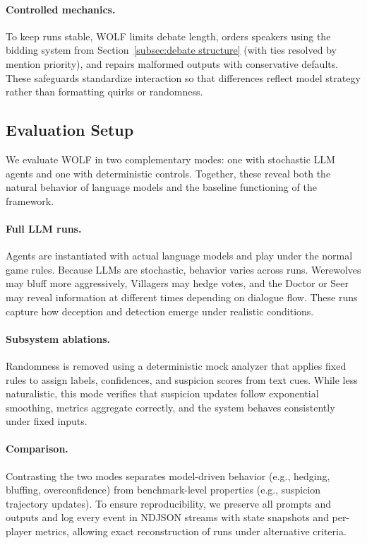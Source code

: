 \documentclass{article}
\begin{document}
\paragraph{Controlled mechanics.} 
To keep runs stable, WOLF limits debate length, orders speakers using the bidding system from Section~\ref{subsec:debate structure} (with ties resolved by mention priority), and repairs malformed outputs with conservative defaults. These safeguards standardize interaction so that differences reflect model strategy rather than formatting quirks or randomness.

\subsection{Evaluation Setup}
We evaluate WOLF in two complementary modes: one with stochastic LLM agents and one with deterministic controls. Together, these reveal both the natural behavior of language models and the baseline functioning of the framework.  

\paragraph{Full LLM runs.} 
Agents are instantiated with actual language models and play under the normal game rules. Because LLMs are stochastic, behavior varies across runs. Werewolves may bluff more aggressively, Villagers may hedge votes, and the Doctor or Seer may reveal information at different times depending on dialogue flow. These runs capture how deception and detection emerge under realistic conditions.  

\paragraph{Subsystem ablations.} 
Randomness is removed using a deterministic mock analyzer that applies fixed rules to assign labels, confidences, and suspicion scores from text cues. While less naturalistic, this mode verifies that suspicion updates follow exponential smoothing, metrics aggregate correctly, and the system behaves consistently under fixed inputs.  

\paragraph{Comparison.} 
Contrasting the two modes separates model-driven behavior (e.g., hedging, bluffing, overconfidence) from benchmark-level properties (e.g., suspicion trajectory updates). To ensure reproducibility, we preserve all prompts and outputs and log every event in NDJSON streams with state snapshots and per-player metrics, allowing exact reconstruction of runs under alternative criteria.  
\end{document}
